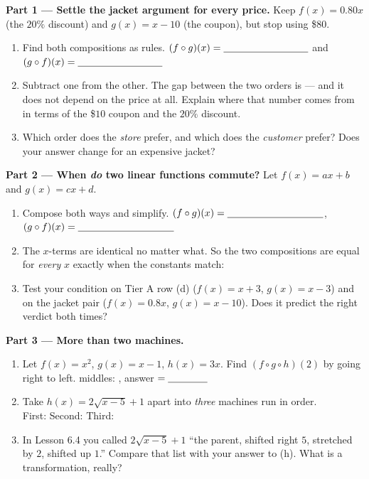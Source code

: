 \documentclass[10pt]{article}
\begin{document}
\begin{tcolorbox}[colback=white, colframe=black!40, title=\textbf{Tier E --- Extension},
    fonttitle=\bfseries, arc=1.5mm, left=3mm, right=3mm, top=2mm, bottom=2mm, breakable]
\textbf{Part 1 --- Settle the jacket argument for every price.} Keep $f(x)=0.80x$ (the $20\%$
discount) and $g(x)=x-10$ (the coupon), but stop using \$$80$.
\begin{enumerate}[label=(\alph*), leftmargin=1.9em, itemsep=6pt]
  \item Find both compositions as rules. \; $(f\circ g)(x)=\blank{3.0cm}$ \; and \;
        $(g\circ f)(x)=\blank{3.0cm}$
        \vspace{0.35in}
  \item Subtract one from the other. The gap between the two orders is \blank{2.0cm} --- and it does
        not depend on the price at all. Explain where that number comes from in terms of the
        \$$10$ coupon and the $20\%$ discount. 
  \item Which order does the \emph{store} prefer, and which does the \emph{customer} prefer? Does
        your answer change for an expensive jacket? 
\end{enumerate}

\vspace{4pt}
\textbf{Part 2 --- When \emph{do} two linear functions commute?} Let $f(x)=ax+b$ and $g(x)=cx+d$.
\begin{enumerate}[label=(\alph*), leftmargin=1.9em, itemsep=6pt, start=4]
  \item Compose both ways and simplify. \; $(f\circ g)(x)=\blank{3.4cm}$, \;
        $(g\circ f)(x)=\blank{3.4cm}$
        \vspace{0.40in}
  \item The $x$-terms are identical no matter what. So the two compositions are equal for
        \emph{every} $x$ exactly when the constants match: \blank{4.0cm}
  \item Test your condition on Tier A row (d) ($f(x)=x+3$, $g(x)=x-3$) and on the jacket pair
        ($f(x)=0.8x$, $g(x)=x-10$). Does it predict the right verdict both times? 
\end{enumerate}

\vspace{4pt}
\textbf{Part 3 --- More than two machines.}
\begin{enumerate}[label=(\alph*), leftmargin=1.9em, itemsep=6pt, start=7]
  \item Let $f(x)=x^{2}$, $g(x)=x-1$, $h(x)=3x$. Find $(f\circ g\circ h)(2)$ by going right to left.
        \; middles: \blank{1.2cm}, \blank{1.2cm} \; answer $=\blank{1.4cm}$
  \item Take $h(x)=2\sqrt{x-5}+1$ apart into \emph{three} machines run in order. \\
        First: \blank{2.6cm} \quad Second: \blank{2.6cm} \quad Third: \blank{3.0cm}
  \item In Lesson 6.4 you called $2\sqrt{x-5}+1$ ``the parent, shifted right $5$, stretched by $2$,
        shifted up $1$.'' Compare that list with your answer to (h). What is a transformation,
        really? 
\end{enumerate}


\end{tcolorbox}
\end{document}
